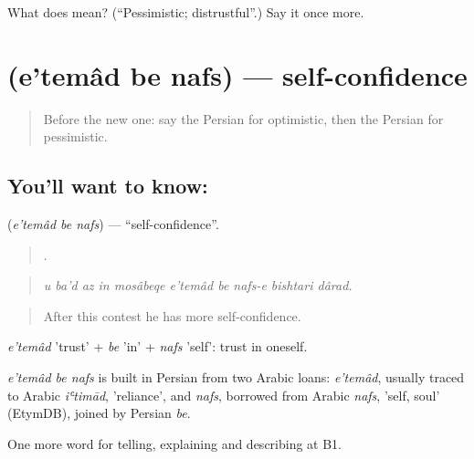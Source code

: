 \begin{tcolorbox}[breakable,colback=teal!4,colframe=teal!35!black,title={Before you move on}]
What does  mean? (\textquotedblleft{}Pessimistic; distrustful\textquotedblright{}.) Say it once more.
\end{tcolorbox}
\section[\texorpdfstring{\fa{اعتماد} \fa{به} \fa{نفس} (e'temâd be nafs)}{اعتماد به نفس (e'temâd be nafs)}]{   (e'temâd be nafs) — self-confidence}

\label{lesson:FA-C487-etemad-be-nafs}



\begin{quote}
Before the new one: say the Persian for optimistic, then the Persian for pessimistic.
\end{quote}

\subsection*{You'll want to know:   }
\textbf{  } (\emph{e'temâd be nafs}) — \textquotedblleft{}self-confidence\textquotedblright{}.

\begin{quote}
         .
\end{quote}

\begin{quote}
\emph{u ba'd az in mosâbeqe e'temâd be nafs-e bishtari dârad.}
\end{quote}

\begin{quote}
After this contest he has more self-confidence.
\end{quote}

\emph{e'temâd} 'trust' + \emph{be} 'in' + \emph{nafs} 'self': trust in oneself.

\begin{cousinweb}
\emph{e'temâd be nafs} is built in Persian from two Arabic loans: \emph{e'temâd}, usually traced to Arabic \emph{iʿtimād}, 'reliance', and \emph{nafs}, borrowed from Arabic \emph{nafs}, 'self, soul' (EtymDB), joined by Persian \emph{be}.
\end{cousinweb}

\begin{grammarlens}[title={What you've built}]
One more word for telling, explaining and describing at B1.
\end{grammarlens}

